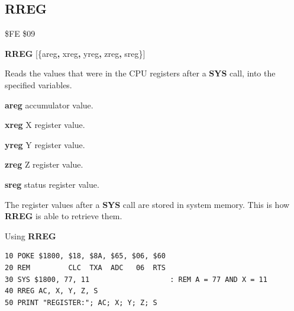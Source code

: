 \subsection{RREG}
\begin{description}[leftmargin=2cm,style=nextline]
\item [Token:]    \$FE \$09

\item [Format:]   {\bf RREG} [\{areg{\bf,} xreg{\bf,} yreg{\bf,} zreg{\bf,} sreg\}]

\item [Usage:]    Reads the values that were in the CPU registers after a {\bf SYS} call, into the specified variables.

                  {\bf areg} accumulator value.

                  {\bf xreg} X register value.

                  {\bf yreg} Y register value.

                  {\bf zreg} Z register value.

                  {\bf sreg} status register value.

\item [Remarks:]  The register values after a {\bf SYS} call are stored in system memory. This is how {\bf RREG} is able to retrieve them.

\item [Example:]  Using {\bf RREG}
\begin{tcolorbox}[colback=black,coltext=white]
\verbatimfont{\codefont}
\begin{verbatim}
10 POKE $1800, $18, $8A, $65, $06, $60
20 REM         CLC  TXA  ADC   06  RTS
30 SYS $1800, 77, 11                   : REM A = 77 AND X = 11
40 RREG AC, X, Y, Z, S
50 PRINT "REGISTER:"; AC; X; Y; Z; S
\end{verbatim}
\end{tcolorbox}
\end{description}


\newpage
